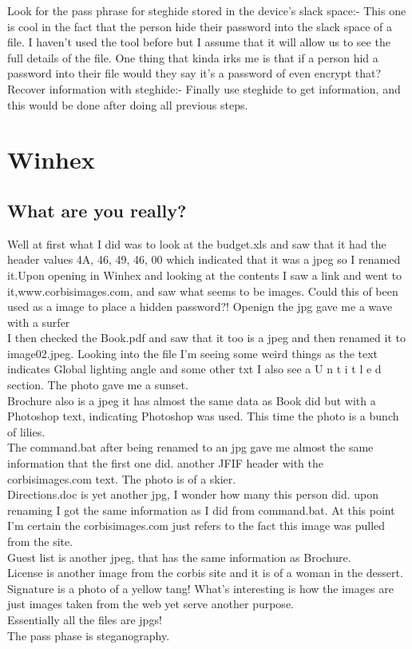 \documentclass[12ptletterpaper]{paper}
\newcommand\tab[1][1cm]{\hspace*{#1}}
\begin{document}
\begin{flushleft}
		\tab Look for the pass phrase for steghide stored in the device’s slack space:- This one is cool in the fact that the person hide their password into the slack space of a file. I haven't used the tool before but I assume that it will allow us to see the full details of the file. One thing that kinda irks me is that if a person hid a password into their file would they say it's a password of even encrypt that?\\
		\tab Recover information with steghide:- Finally use steghide to get information, and this would be done after doing all previous steps.
		\section{Winhex}
		\subsection{What are you really?}
		\tab Well at first what I did was to look at the budget.xls and saw that it had the header values  4A, 46, 49, 46, 00 which indicated that it was a jpeg so I renamed it.Upon opening in Winhex and looking at the contents I saw a link and went to it,www.corbisimages.com, and saw what seems to be images. Could this of been used as a image to place a hidden password?! Openign the jpg gave me a wave with a surfer \\
		I then checked the Book.pdf and saw that it too is a jpeg and then renamed it to image02.jpeg. Looking into the file I'm seeing some weird things as the text indicates Global lighting angle and some other txt I also see a U n t i t l e d section. The photo gave me a sunset.\\
		Brochure also is a jpeg it has almost the same data as Book did but with a Photoshop text, indicating Photoshop was used. This time the photo is a bunch of lilies.\\
		The command.bat after being renamed to an jpg gave me almost the same information that the first one did. another JFIF header with the corbisimages.com text. The photo is of a skier.\\
		Directions.doc is yet another jpg, I wonder how many this person did. upon renaming I got the same information as I did from command.bat. At this point I'm certain the corbisimages.com just refers to the fact this image was pulled from the site.\\
		Guest list is another jpeg, that has the same information as Brochure.\\
		License is another image from the corbis site and it is of a woman in the dessert.\\
		Signature is a photo of  a yellow tang! What's interesting is how the images are just images taken from the web yet serve another purpose.\\
		Essentially all the files are jpgs!\\
		\tab The pass phase is steganography.\\
		

\end{flushleft}
\end{document}
